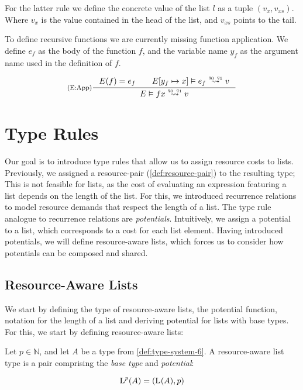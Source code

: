 For the latter rule we define the concrete value of the list \(l\) as a tuple \((v_x, v_{xs})\). Where \(v_x\) is the value contained in the head of the list, and \(v_{xs}\) points to the tail. 

To define recursive functions we are currently missing function application. We define \(e_f\) as the body of the function \(f\), and the variable name \(y_f\) as the argument name used in the definition of \(f\). 

\[
   \inference[(E:App)]
   {E(f) = e_f \qquad \evals{\envaugment{E}{y_f}{x}}{e_f}{v}{q_0}{q_1}}
   {\evals{E}{f x}{v}{q_0}{q_1}}
\]

\section{Type Rules}

Our goal is to introduce type rules that allow us to assign resource costs to lists. Previously, we assigned a resource-pair (\cref{def:resource-pair}) to the resulting type; This is not feasible for lists, as the cost of evaluating an expression featuring a list depends on the length of the list. For this, we introduced recurrence relations to model resource demands that respect the length of a list. The type rule analogue to recurrence relations are \emph{potentials}. Intuitively, we assign a potential to a list, which corresponds to a cost for each list element. Having introduced potentials, we will define resource-aware lists, which forces us to consider how potentials can be composed and shared.

\subsection{Resource-Aware Lists}\label{sec:resource-aware-lists}

We start by defining the type of resource-aware lists, the potential function, notation for the length of a list and deriving potential for lists with base types. For this, we start by defining resource-aware lists:

\begin{definition}\label{def:ra-list}
   Let \(p \in \mathbb{N}\), and let \(A\) be a type from \cref{def:type-system-6}. A resource-aware list type is a pair comprising the \emph{base type} and \emph{potential}:

   \[
      \text{L}^{p}(A) = (\text{L}^{}(A), p)
   \]
\end{definition}

